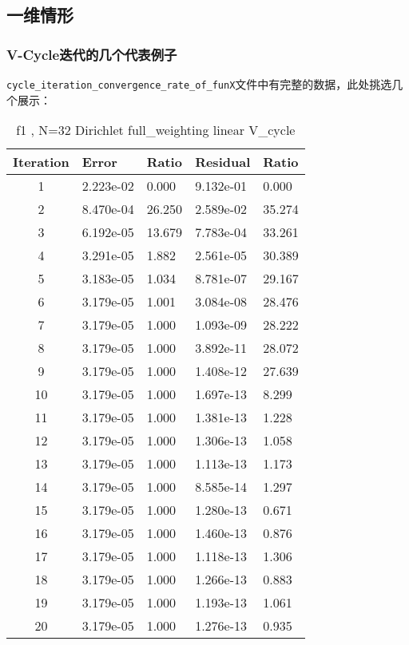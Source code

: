 \documentclass[12]{article}%
\begin{document}
\subsection{一维情形}
\subsubsection{{V-Cycle迭代的几个代表例子}}
\verb|cycle_iteration_convergence_rate_of_funX|文件中有完整的数据，此处挑选几个展示：
\begin{table}[H]
    \centering
    \caption{f1 , N=32  Dirichlet full\_weighting linear V\_cycle}
    \begin{tabular}{|c|l|l|l|l|}
    \hline
    Iteration & Error       & Ratio     & Residual    & Ratio     \\ \hline
    1 & 2.223e-02 & 0.000 & 9.132e-01 & 0.000\\ \hline 
    2 & 8.470e-04 & 26.250 & 2.589e-02 & 35.274\\ \hline 
    3 & 6.192e-05 & 13.679 & 7.783e-04 & 33.261\\ \hline 
    4 & 3.291e-05 & 1.882 & 2.561e-05 & 30.389\\ \hline 
    5 & 3.183e-05 & 1.034 & 8.781e-07 & 29.167\\ \hline 
    6 & 3.179e-05 & 1.001 & 3.084e-08 & 28.476\\ \hline 
    7 & 3.179e-05 & 1.000 & 1.093e-09 & 28.222\\ \hline 
    8 & 3.179e-05 & 1.000 & 3.892e-11 & 28.072\\ \hline 
    9 & 3.179e-05 & 1.000 & 1.408e-12 & 27.639\\ \hline 
    10 & 3.179e-05 & 1.000 & 1.697e-13 & 8.299\\ \hline 
    11 & 3.179e-05 & 1.000 & 1.381e-13 & 1.228\\ \hline 
    12 & 3.179e-05 & 1.000 & 1.306e-13 & 1.058\\ \hline 
    13 & 3.179e-05 & 1.000 & 1.113e-13 & 1.173\\ \hline 
    14 & 3.179e-05 & 1.000 & 8.585e-14 & 1.297\\ \hline 
    15 & 3.179e-05 & 1.000 & 1.280e-13 & 0.671\\ \hline 
    16 & 3.179e-05 & 1.000 & 1.460e-13 & 0.876\\ \hline 
    17 & 3.179e-05 & 1.000 & 1.118e-13 & 1.306\\ \hline 
    18 & 3.179e-05 & 1.000 & 1.266e-13 & 0.883\\ \hline 
    19 & 3.179e-05 & 1.000 & 1.193e-13 & 1.061\\ \hline 
    20 & 3.179e-05 & 1.000 & 1.276e-13 & 0.935\\ \hline     \end{tabular}
    \end{table}
\end{document}
